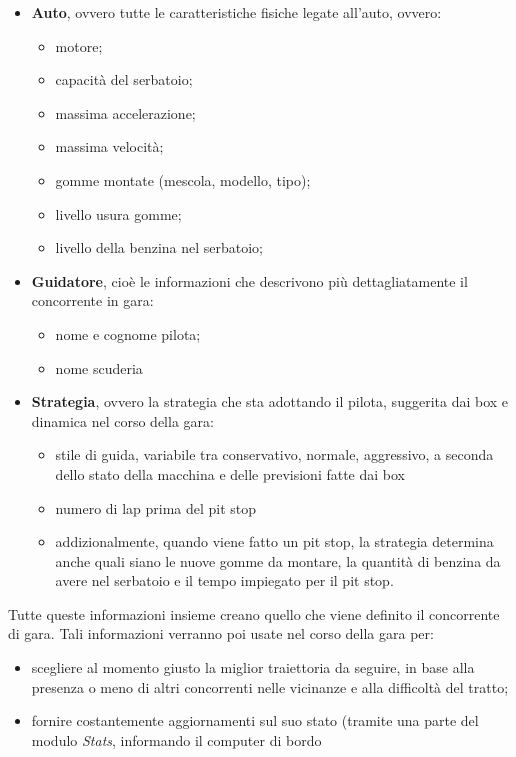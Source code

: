 \begin{description}
\begin{itemize}
\item \textbf{Auto}, ovvero tutte le caratteristiche fisiche legate all'auto, ovvero:
	\begin{itemize}
		\item motore;
		\item capacit\`{a} del serbatoio;
		\item massima accelerazione;
		\item massima velocit\`{a};
		\item gomme montate (mescola, modello, tipo);
		\item livello usura gomme;
		\item livello della benzina nel serbatoio;
	\end{itemize}
\item \textbf{Guidatore}, cio\`{e} le informazioni che descrivono pi\`{u} dettagliatamente il concorrente in gara:
	\begin{itemize}
		\item nome e cognome pilota;
		\item nome scuderia
	\end{itemize}
\item \textbf{Strategia}, ovvero la strategia che sta adottando il pilota, suggerita dai box e dinamica nel corso della gara:
	\begin{itemize}
		\item stile di guida, variabile tra conservativo, normale, aggressivo, a seconda dello stato della macchina e delle
			previsioni fatte dai box
		\item numero di lap prima del pit stop
		\item addizionalmente, quando viene fatto un pit stop, la strategia determina anche quali siano le nuove gomme da montare,
		 	la quantit\`{a} di benzina da avere nel serbatoio e il tempo impiegato per il pit stop.
	\end{itemize}
\end{itemize}
Tutte queste informazioni insieme creano quello che viene definito il concorrente di gara. 
Tali informazioni verranno poi usate nel corso della gara per:
	\begin{itemize}
		\item scegliere al momento giusto la miglior traiettoria da seguire, in base alla presenza o meno di altri concorrenti
			nelle vicinanze e alla difficolt\`{a} del tratto;
		\item fornire costantemente aggiornamenti sul suo stato (tramite una parte del modulo \emph{Stats}, informando il computer di bordo

\end{itemize}
\end{description}
